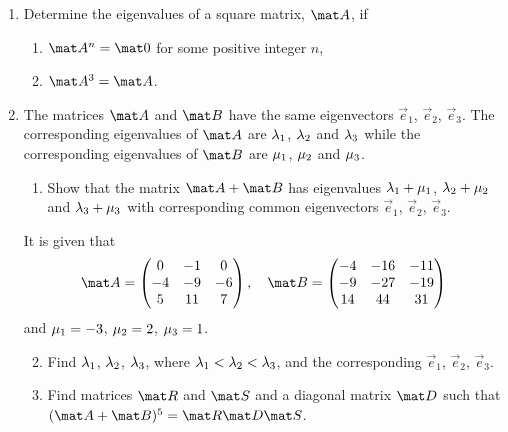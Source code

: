 \begin{problem}
    \begin{enumerate}
        \item Determine the eigenvalues of a square matrix, $\mat A$, if
        \begin{enumerate}
            \item $\mat A^n = \mat 0$ for some positive integer $n$,
            \item $\mat A^3 = \mat A$.
        \end{enumerate}
        \item The matrices $\mat A$ and $\mat B$ have the same eigenvectors $\vec e_1$, $\vec e_2$, $\vec e_3$. The corresponding eigenvalues of $\mat A$ are $\lambda_1$, $\lambda_2$ and $\lambda_3$ while the corresponding eigenvalues of $\mat B$ are $\mu_1$, $\mu_2$ and $\mu_3$.
        \begin{enumerate}
            \item Show that the matrix $\mat A + \mat B$ has eigenvalues $\lambda_1 + \mu_1$, $\lambda_2 + \mu_2$ and $\lambda_3 + \mu_3$ with corresponding common eigenvectors $\vec e_1$, $\vec e_2$, $\vec e_3$.
        \end{enumerate}

        It is given that \[\mat A = \begin{pmatrix}0 & -1 & 0 \\ -4 & -9 & -6 \\ 5 & 11 & 7\end{pmatrix}, \quad \mat B = \begin{pmatrix}-4 & -16 & -11 \\ -9 & -27 & -19 \\ 14 & 44 & 31\end{pmatrix}\] and $\mu_1 = -3$, $\mu_2 = 2$, $\mu_3 = 1$.

        \begin{enumerate}
            \setcounter{enumii}{1}
            \item Find $\lambda_1$, $\lambda_2$, $\lambda_3$, where $\lambda_1 < \lambda_2 < \lambda_3$, and the corresponding $\vec e_1$, $\vec e_2$, $\vec e_3$.
            \item Find matrices $\mat R$ and $\mat S$ and a diagonal matrix $\mat D$ such that $(\mat A + \mat B)^5 = \mat R \mat D \mat S$.
        \end{enumerate}
    \end{enumerate}
\end{problem}
